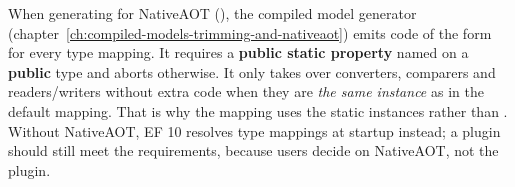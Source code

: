 \begin{important}
  When generating for NativeAOT (), the
  compiled model generator (chapter~\ref{ch:compiled-models-trimming-and-nativeaot}) emits
  code of the form
  for every type mapping. It requires a \textbf{public static property} named 
  on a \textbf{public} type and aborts otherwise. It only takes over converters,
  comparers and readers/writers without extra code when they are \emph{the same instance} as in the
  default mapping. That is why the mapping uses the static instances rather than . Without NativeAOT, EF 10
  resolves type mappings at startup instead; a plugin should still meet the requirements,
  because users decide on NativeAOT, not the plugin.
\end{important}

